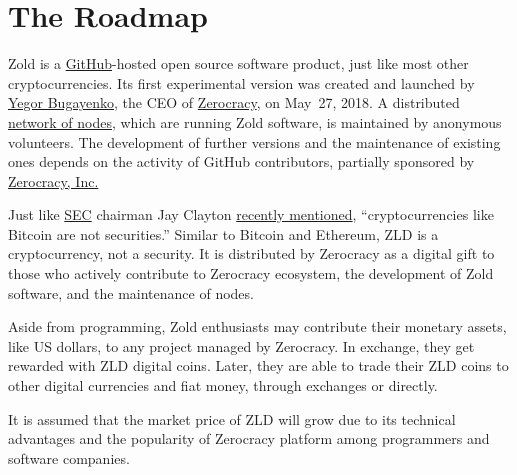 \documentclass[12pt,oneside]{article}
\begin{document}
\pagebreak

\section*{The Roadmap}

Zold is a \href{https://github.com/zold-io}{GitHub}-hosted open source
software product, just like most other cryptocurrencies.
Its first experimental version was created and launched by \href{https://www.yegor256.com}{Yegor Bugayenko},
the CEO of \href{https://www.zerocracy.com}{Zerocracy}, on May~27, 2018.
A distributed \href{http://www.zold.io/map.html}{network of nodes},
which are running Zold software, is maintained by
anonymous volunteers. The development of further versions and the
maintenance of existing ones depends on the activity of GitHub
contributors, partially sponsored by \href{https://www.zerocracy.com}{Zerocracy, Inc.}

Just like \href{https://www.sec.gov/}{SEC} chairman Jay Clayton
\href{https://www.cnbc.com/video/2018/06/06/sec-chairman-cryptocurrencies-like-bitcoin--not-securities.html}{recently mentioned},
``cryptocurrencies like Bitcoin are not securities.''
Similar to Bitcoin and Ethereum, ZLD is a cryptocurrency, not a security.
It is distributed by Zerocracy as a digital gift to those who
actively contribute to Zerocracy ecosystem, the development of Zold software,
and the maintenance of nodes.

Aside from programming, Zold enthusiasts may contribute their monetary assets,
like US dollars, to any project managed by Zerocracy.
In exchange, they get rewarded with ZLD digital coins.
Later, they are able to trade their ZLD coins to other digital currencies
and fiat money, through exchanges or directly.

It is assumed that the market price of ZLD will grow due to its technical
advantages and the popularity of Zerocracy platform among programmers
and software companies.
\end{document}
